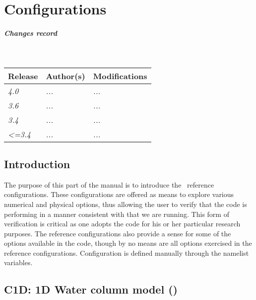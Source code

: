 \documentclass[../main/NEMO_manual]{subfiles}
\begin{document}
\chapter{Configurations}
\label{chap:CFGS}

\chaptertoc

\paragraph{Changes record} ~\\

{\footnotesize
  \begin{tabularx}{\textwidth}{l||X|X}
    Release & Author(s) & Modifications \\
    \hline
    {\em   4.0} & {\em ...} & {\em ...} \\
    {\em   3.6} & {\em ...} & {\em ...} \\
    {\em   3.4} & {\em ...} & {\em ...} \\
    {\em <=3.4} & {\em ...} & {\em ...}
  \end{tabularx}
}

\clearpage

\section{Introduction}
\label{sec:CFGS_intro}

The purpose of this part of the manual is to introduce the \NEMO\ reference configurations.
These configurations are offered as means to explore various numerical and physical options,
thus allowing the user to verify that the code is performing in a manner consistent with that we are running.
This form of verification is critical as one adopts the code for his or her particular research purposes.
The reference configurations also provide a sense for some of the options available in the code,
though by no means are all options exercised in the reference configurations.
Configuration is defined manually through the  namelist variables.

\begin{listing}
  \caption{}
  \label{lst:namcfg}
\end{listing}

\section[C1D: 1D Water column model (\texttt{\textbf{key\_c1d}})]{C1D: 1D Water column model (\protect{})}
\label{sec:CFGS_c1d}
\end{document}

